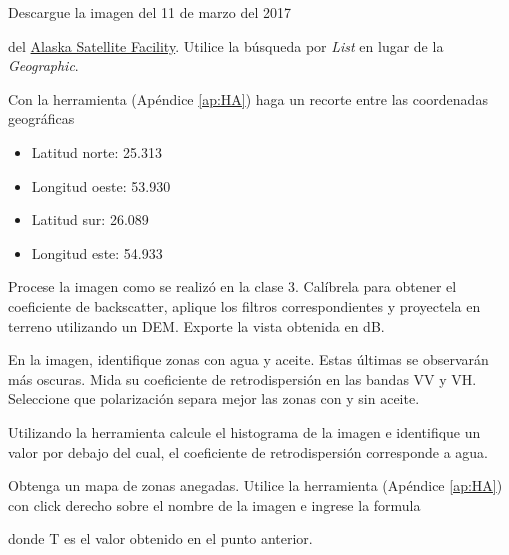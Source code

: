 \begin{que}
    Descargue la imagen del 11 de marzo del 2017
    \begin{center}\end{center} del \href{https://vertex.daac.asf.alaska.edu/}{Alaska Satellite Facility}. Utilice la búsqueda por \emph{List} en lugar de la \emph{Geographic}.
\end{que}

\begin{que}
    Con la herramienta  (Apéndice \ref{ap:HA}) haga un recorte entre las coordenadas geográficas
    \begin{itemize}
        \item Latitud norte: 25.313
        \item Longitud oeste: 53.930
        \item Latitud sur: 26.089
        \item Longitud este: 54.933
    \end{itemize}

\end{que}

\begin{que}
    Procese la imagen como se realizó en la clase 3. Calíbrela para obtener el coeficiente de backscatter, aplique los filtros correspondientes y proyectela en terreno utilizando un DEM. Exporte la vista obtenida en dB.
\end{que}

\begin{que}
    En la imagen, identifique zonas con agua y aceite. Estas últimas se observarán más oscuras. Mida su coeficiente de retrodispersión en las bandas VV y VH. Seleccione que polarización separa mejor las zonas con y sin aceite.
\end{que}


\begin{que}
    Utilizando la herramienta  calcule el histograma de la imagen e identifique un valor por debajo del cual, el coeficiente de retrodispersión corresponde a agua.
\end{que}

\begin{que}
  Obtenga un mapa de zonas anegadas. Utilice la herramienta  (Apéndice \ref{ap:HA}) con click derecho sobre el nombre de la imagen e ingrese la formula
  \begin{center}
  \end{center}
  donde T es el valor obtenido en el punto anterior.
\end{que}

